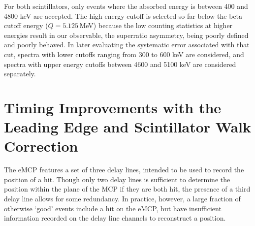 For both scintillators, only events where the absorbed energy is between 400 and 4800 keV are accepted.  The high energy cutoff is selected so far below the beta cutoff energy ($Q=5.125\,$MeV) because the low counting statistics at higher energies result in our observable, the superratio asymmetry, being poorly defined and poorly behaved.  In later evaluating the systematic error associated with that cut, spectra with lower cutoffs ranging from 300 to 600 keV are considered, and spectra with upper energy cutoffs between 4600 and 5100 keV are considered separately.  




\section{Timing Improvements with the Leading Edge and Scintillator Walk Correction}
\label{section:emcp_cuts}

The eMCP features a set of three delay lines, intended to be used to record the position of a hit.
Though only two delay lines is sufficient to determine the position within the plane of the MCP if they are both hit, the presence of a third delay line allows for some redundancy.  In practice, however, a large fraction of otherwise `good' events include a hit on the eMCP, but have insufficient information recorded on the delay line channels to reconstruct a position.  


